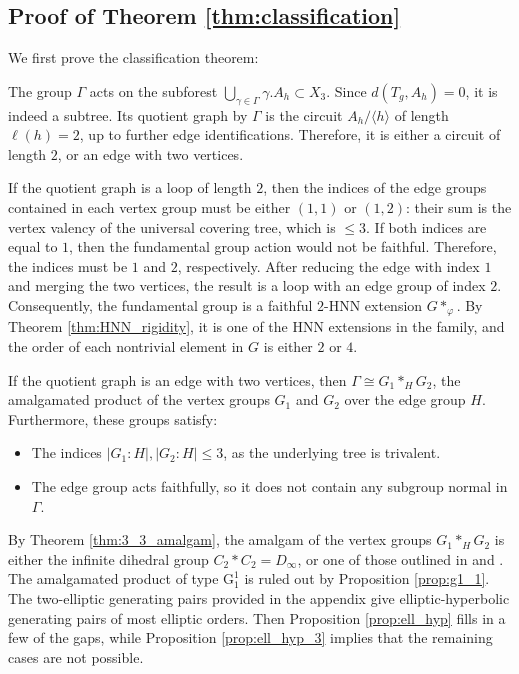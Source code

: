 \documentclass[12pt,leqno]{amsart}
\makeatletter
\renewenvironment{proof}[1][\proofname]{%
	\par
	\pushQED{\qed}%
	\normalfont
	\topsep6\p@\@plus6\p@\relax
	\trivlist
	\item[\hskip\labelsep\itshape #1\@addpunct{.}]%
	\ignorespaces
}{%
	\par\nobreak\vspace{2pt}%
	\popQED%
	\medskip%
	\endtrivlist
	\@endpefalse
}
\newcommand{\2}{L^2_{\rm per}(0, T)}
\numberwithin{equation}{section}
\numberwithin{figure}{section}
\makeatother
\begin{document}
\subsection{Proof of Theorem \ref{thm:classification}}
We first prove the classification theorem:
\begin{proof}[Proof of Theorem \ref{thm:classification}]
    The group $\Gamma$ acts on the subforest $\bigcup_{\gamma\in\Gamma}\gamma.A_h\subset X_3$. Since $d(T_g,A_h) = 0$, it is indeed a subtree. Its quotient graph by $\Gamma$ is the circuit $A_h/\langle h\rangle$ of length $\ell(h) = 2$, up to further edge identifications. Therefore, it is either a circuit of length $2$, or an edge with two vertices.

    If the quotient graph is a loop of length $2$, then the indices of the edge groups contained in each vertex group must be either $(1,1)$ or $(1,2)$: their sum is the vertex valency of the universal covering tree, which is $\leq 3$. If both indices are equal to $1$, then the fundamental group action would not be faithful. Therefore, the indices must be $1$ and $2$, respectively. After reducing the edge with index $1$ and merging the two vertices, the result is a loop with an edge group of index $2$. Consequently, the fundamental group is a faithful $2$-HNN extension $G*_\varphi$. By Theorem \ref{thm:HNN_rigidity}, it is one of the HNN extensions in the family, and the order of each nontrivial element in $G$ is either $2$ or $4$.
    
    If the quotient graph is an edge with two vertices, then $\Gamma\cong G_1*_H G_2$, the amalgamated product of the vertex groups $G_1$ and $G_2$ over the edge group $H$. Furthermore, these groups satisfy:
    \begin{itemize}
        \item The indices $\lvert G_1: H\rvert, \lvert G_2: H\rvert\leq 3$, as the underlying tree is trivalent.
        \item The edge group acts faithfully, so it does not contain any subgroup normal in $\Gamma$.
    \end{itemize}
    By Theorem \ref{thm:3_3_amalgam}, the amalgam of the vertex groups $G_1*_H G_2$ is either the infinite dihedral group $C_2*C_2 = D_\infty$, or one of those outlined in \cite{djokovic1977regular} and \cite{goldschmidt1980automorphisms}. The amalgamated product of type $\mathrm{G}_1^1$ is ruled out by Proposition \ref{prop:g1_1}. The two-elliptic generating pairs provided in the appendix give elliptic-hyperbolic generating pairs of most elliptic orders. Then Proposition \ref{prop:ell_hyp} fills in a few of the gaps, while Proposition \ref{prop:ell_hyp_3} implies that the remaining cases are not possible.
\end{proof}
\end{document}
